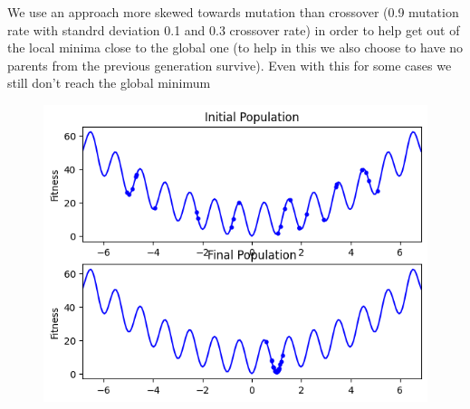 We use an approach more skewed towards mutation than crossover (0.9 mutation rate with standrd deviation 0.1 and 0.3 crossover rate) in order to help get out of the local minima close to the global one (to help in this we also choose to have no parents from the previous generation survive). Even with this for some cases we still don't reach the global minimum
\begin{figure}[H]
    \centering
    \includegraphics[width=\linewidth]{images/lab2/rast_err.png}
\end{figure}


